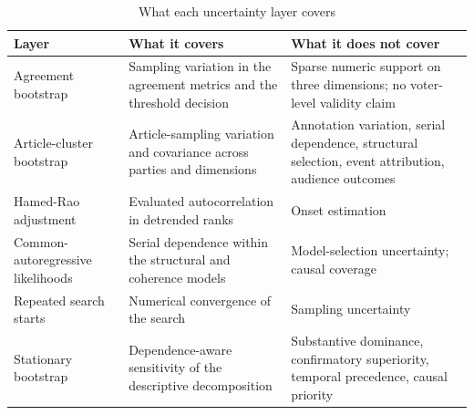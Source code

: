 \begin{table}[htbp]
\centering\small
\caption{What each uncertainty layer covers}
\begin{tabular}{@{}p{}p{}p{}@{}}
\toprule
\textbf{Layer} & \textbf{What it covers} & \textbf{What it does not cover} \\
\midrule
Agreement bootstrap & Sampling variation in the agreement metrics and the threshold decision & Sparse numeric support on three dimensions; no voter-level validity claim \\
Article-cluster bootstrap & Article-sampling variation and covariance across parties and dimensions & Annotation variation, serial dependence, structural selection, event attribution, audience outcomes \\
Hamed-Rao adjustment & Evaluated autocorrelation in detrended ranks & Onset estimation \\
Common-autoregressive likelihoods & Serial dependence within the structural and coherence models & Model-selection uncertainty; causal coverage \\
Repeated search starts & Numerical convergence of the search & Sampling uncertainty \\
Stationary bootstrap & Dependence-aware sensitivity of the descriptive decomposition & Substantive dominance, confirmatory superiority, temporal precedence, causal priority \\
\bottomrule
\end{tabular}
\end{table}
